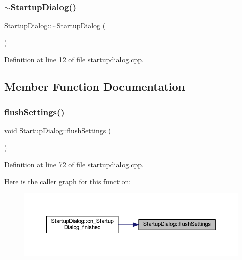 \subsubsection{\texorpdfstring{$\sim$StartupDialog()}{~StartupDialog()}}
{\footnotesize\ttfamily Startup\+Dialog\+::$\sim$\+Startup\+Dialog (\begin{DoxyParamCaption}{ }\end{DoxyParamCaption})}



Definition at line 12 of file startupdialog.\+cpp.



\subsection{Member Function Documentation}
\mbox{\label{classStartupDialog_a59d1dc04138b5f7d53ca0b819a61068e}} 
\subsubsection{\texorpdfstring{flushSettings()}{flushSettings()}}
{\footnotesize\ttfamily void Startup\+Dialog\+::flush\+Settings (\begin{DoxyParamCaption}{ }\end{DoxyParamCaption})\hspace{0.3cm}{\ttfamily [private]}}



Definition at line 72 of file startupdialog.\+cpp.

Here is the caller graph for this function\+:
\nopagebreak
\begin{figure}[H]
\begin{center}
\leavevmode
\includegraphics[width=350pt]{classStartupDialog_a59d1dc04138b5f7d53ca0b819a61068e_icgraph}
\end{center}
\end{figure}
\mbox{\label{classStartupDialog_a931800d2e42ff7172a2245252f04c622}} 
